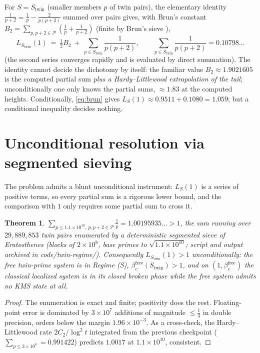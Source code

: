 \documentclass[11pt]{amsart}
\newtheorem{theorem}{Theorem}[section]
\theoremstyle{remark}
\begin{document}
For $S=S_{\mathrm{twin}}$ (smaller members $p$ of twin pairs), the elementary identity
$\frac1{p+2}=\frac1p-\frac2{p(p+2)}$ summed over pairs gives, with Brun's constant
$B_2=\sum_{p,p+2\in\mathcal{P}}(\frac1p+\frac1{p+2})$ (finite by Brun's sieve \cite{HR}),
\begin{equation}\label{eq:brun}
L_{S_{\mathrm{twin}}}(1)\ =\ \tfrac12B_2\ +\ \sum_{p\in S_{\mathrm{twin}}}\frac1{p(p+2)},
\qquad
\sum_{p\in S_{\mathrm{twin}}}\frac1{p(p+2)}=0.10798\ldots
\end{equation}
(the second series converges rapidly and is evaluated by direct summation). The identity
cannot decide the dichotomy by itself: the familiar value $B_2\approx1.9021605$
\cite{Nicely} is the computed partial sum \emph{plus a Hardy--Littlewood extrapolation of
the tail}; unconditionally one only knows the partial sums, $\approx1.83$ at the computed
heights. Conditionally, \eqref{eq:brun} gives $L_S(1)\approx0.9511+0.1080=1.059$; but a
conditional inequality decides nothing.

\section{Unconditional resolution via segmented sieving}\label{sec:sieve}

The problem admits a blunt unconditional instrument: $L_S(1)$ is a series of positive
terms, so every partial sum is a rigorous lower bound, and the comparison with $1$ only
requires some partial sum to cross it.

\begin{theorem}\label{thm:main}
$\displaystyle\sum_{p\le1.1\times10^{10},\ p,p+2\in\mathcal{P}}\frac1p=1.00195935\ldots>1$, the sum
running over $29{,}889{,}853$ twin pairs enumerated by a deterministic segmented sieve of
Eratosthenes (blocks of $2\times10^8$, base primes to $\sqrt{1.1\times10^{10}}$; script
and output archived in \emph{code/twin-regime/}). Consequently
$L_{S_{\mathrm{twin}}}(1)>1$ unconditionally: the free twin-prime system is in Regime
(S), $\beta_c^{\mathrm{free}}(S_{\mathrm{twin}})>1$, and on
$(1,\beta_c^{\mathrm{free}})$ the classical localized system is in its closed broken
phase while the free system admits no KMS state at all.
\end{theorem}

\begin{proof}
The enumeration is exact and finite; positivity does the rest. Floating-point error is
dominated by $3\times10^7$ additions of magnitude $\le\frac13$ in double precision,
orders below the margin $1.96\times10^{-3}$. As a cross-check, the Hardy--Littlewood
rate $2C_2/\log^2t$ integrated from the previous checkpoint
($\sum_{p\le3\times10^8}=0.991422$) predicts $1.0017$ at $1.1\times10^{10}$, consistent.
\end{proof}
\end{document}
